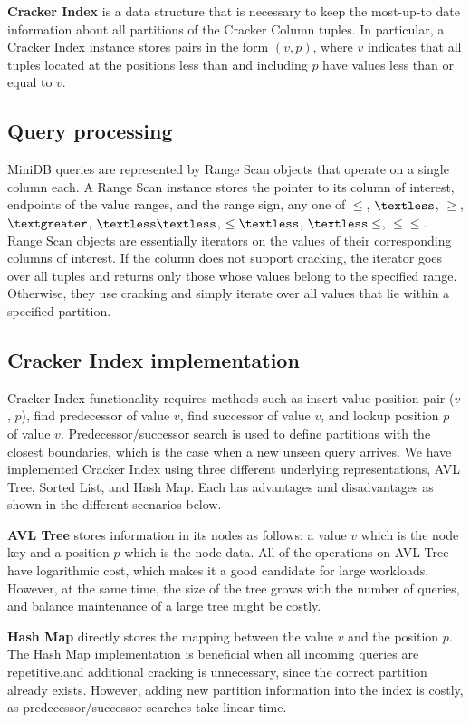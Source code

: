 \textbf{Cracker Index} is a data structure that is necessary to keep the most-up-to date information about all partitions of the Cracker Column tuples. In particular, a Cracker Index instance stores pairs in the form $(v, p)$, where $v$ indicates that all tuples located at the positions less than and including $p$ have values less than or equal to $v$.

\subsection{Query processing}
MiniDB queries are represented by Range Scan objects that operate on a single column each. A Range Scan instance stores the pointer to its column of interest, endpoints of the value ranges, and the range sign, any one of $\leq$, $\textless$, $\geq$, $\textgreater$, $\textless \textless$, $\leq \textless$, $\textless \leq$, $\leq \leq$. Range Scan objects are essentially iterators on the values of their corresponding columns of interest. If the column does not support cracking, the iterator goes over all tuples and returns only those whose values belong to the specified range. Otherwise, they use cracking and simply iterate over all values that lie within a specified partition. 


\subsection{Cracker Index implementation}
Cracker Index functionality requires methods such as insert value-position pair ($v$, $p$), find predecessor of value $v$, find successor of value $v$, and lookup position $p$ of value $v$. Predecessor/successor search is used to define partitions with the closest boundaries, which is the case when a new unseen query arrives. We have implemented Cracker Index using three different underlying representations, AVL Tree, Sorted List, and Hash Map. Each has advantages and disadvantages as shown in the different scenarios below.

\textbf{AVL Tree} stores information in its nodes as follows: a value $v$ which is the node key and a position $p$ which is the node data. All of the operations on AVL Tree have logarithmic cost, which makes it a good candidate for large workloads. However, at the same time, the size of the tree grows with the number of queries, and balance maintenance of a large tree might be costly.\

\textbf{Hash Map} directly stores the mapping between the value $v$ and the position $p$. The Hash Map implementation is beneficial when all incoming queries are repetitive,and additional cracking is unnecessary, since the correct partition already exists. However, adding new partition information into the index is costly, as predecessor/successor searches take linear time.

